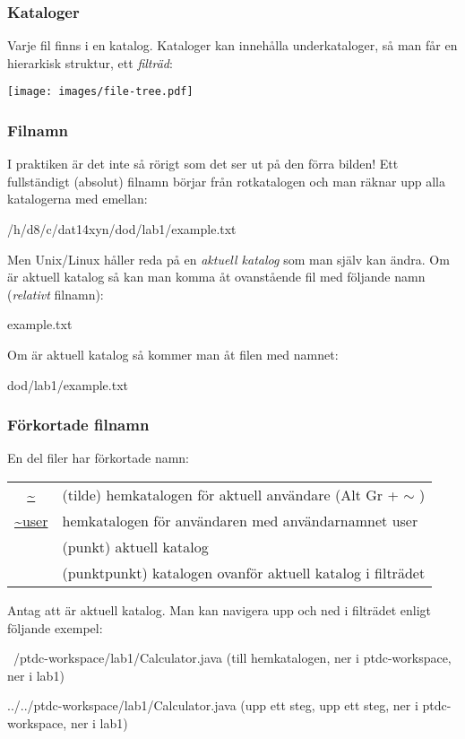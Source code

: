 \begin{frame}[fragile=singleslide]
\frametitle{Kataloger}
Varje fil finns i en katalog. Kataloger kan innehålla underkataloger, så man får en hierarkisk struktur, ett \emph{filträd}:

\begin{center}
\texttt{[image: images/file-tree.pdf]}
\end{center}

\end{frame} 

\begin{frame}[fragile=singleslide]
\frametitle{Filnamn}
I praktiken är det inte så rörigt som det ser ut på den förra bilden!
Ett fullständigt (absolut) filnamn börjar från rotkatalogen och man räknar upp alla katalogerna med \code{/} emellan:

\begin{Code}
/h/d8/c/dat14xyn/dod/lab1/example.txt
\end{Code}

Men Unix/Linux håller reda på en \emph{aktuell katalog} som man själv kan ändra. Om  är aktuell katalog så kan man komma åt ovanstående fil med följande namn (\emph{relativt} filnamn):

\begin{Code}
example.txt
\end{Code}

Om  är aktuell katalog så kommer man åt filen med namnet:

\begin{Code}
dod/lab1/example.txt
\end{Code}

\end{frame} 

\begin{frame}[fragile=singleslide]
\frametitle{Förkortade filnamn}
En del filer har förkortade namn:

\blankline
\begin{tabular}{cl}
\url{~}      & (tilde) hemkatalogen för aktuell användare (Alt Gr + $\sim$ ) \\
\url{~user}  & hemkatalogen för användaren med användarnamnet user \\
\code{.}      & (punkt) aktuell katalog \\
\code{..}     & (punktpunkt) katalogen ovanför aktuell katalog i filträdet \\
\end{tabular}

\blankline
Antag att  är aktuell katalog. Man kan navigera upp och ned i filträdet enligt följande exempel:

\begin{Code}
~/ptdc-workspace/lab1/Calculator.java
(till hemkatalogen, ner i ptdc-workspace, ner i lab1)

../../ptdc-workspace/lab1/Calculator.java
(upp ett steg, upp ett steg, ner i ptdc-workspace, ner i lab1)
\end{Code}

\end{frame} 

